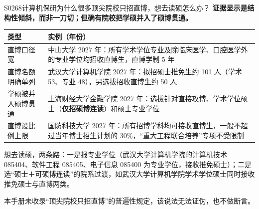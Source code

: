 \begin{qa}{S0268}{计算机保研为什么很多顶尖院校只招直博，想去读硕怎么办？}
\textbf{证据显示是结构性倾斜，而非一刀切；但确有院校把学硕并入了硕博贯通。}

\par\vspace{2pt}\nobreak\begin{center}\footnotesize
\begin{tabularx}{\textwidth}{>{\raggedright\arraybackslash}X>{\raggedright\arraybackslash}X}
\toprule
\textbf{类型} & \textbf{实例（年份）} \\ \midrule
直博口径宽 & 中山大学 2027 年：所有学术学位专业及除临床医学、口腔医学外的专业学位均招收直博生，直博学制 5 年 \\
直博名额明确单列 & 武汉大学计算机学院 2027 年：拟招硕士推免生约 101 人（学术 53、专业 48），另选拔招收直博生约 50 人 \\
学硕被并入硕博贯通 & 上海财经大学金融学院 2027 年：选拔针对直接攻博、学术学位硕士（\textbf{仅招硕博连读}）和硕士专业学位 \\
直博设比例上限 & 国防科技大学 2027 年：所有招博学科均可接收直博生，一般不超过当年博士招生计划的 30\%，“重大工程联合培养”专项不受限制 \\
\bottomrule
\end{tabularx}
\end{center}\vspace{2pt}\par

想去读硕，两条路：一是报专业学位（武汉大学计算机学院的计算机技术 085404、软件工程 085405、电子信息 085400 为专业学位，接收推免硕士）；二是选“硕士＋可硕博连读”的院系过渡，如武汉大学计算机学院学术学位硕士同时接收推免硕士与直博两类。

本手册未收录“顶尖院校只招直博”的普遍性规定，该说法无法证伪，也不做断言。
\end{qa}

